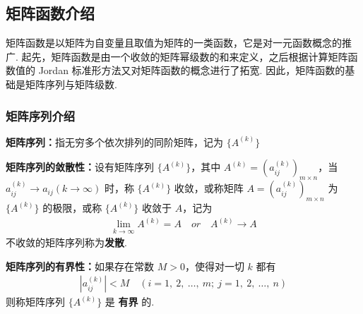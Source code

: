     \subsection{矩阵函数介绍}
        \par 矩阵函数是以矩阵为自变量且取值为矩阵的一类函数，它是对一元函数概念的推广. 起先，矩阵函数是由一个收敛的矩阵幂级数的和来定义，之后根据计算矩阵函数值的 Jordan 标准形方法又对矩阵函数的概念进行了拓宽. 因此，矩阵函数的基础是矩阵序列与矩阵级数.
        \subsubsection{矩阵序列介绍}
            \par \textbf{矩阵序列：}指无穷多个依次排列的同阶矩阵，记为 $\{A^{(k)}\}$
            \par \textbf{矩阵序列的敛散性：}设有矩阵序列 $\{A^{(k)}\}$，其中 $A^{(k)} = (a_{ij}^{(k)})_{m \times n}$，当 $a_{ij}^{(k)} \rightarrow a_{ij}(k \rightarrow \infty)$ 时，称 $\{A^{(k)}\}$ 收敛，或称矩阵 $A = (a_{ij}^{(k)})_{m \times n}$ 为 $\{A^{(k)}\}$ 的极限，或称 $\{A^{(k)}\}$ 收敛于 $A$，记为 
            \begin{align*}
                \lim_{k \rightarrow \infty}A^{(k)} = A \quad or \quad A^{(k)} \rightarrow A 
            \end{align*}
            不收敛的矩阵序列称为\textbf{发散}.
            \par \textbf{矩阵序列的有界性：}如果存在常数 $M > 0$，使得对一切 $k$ 都有 
            \begin{align*}
                |a_{ij}^{(k)}| < M \quad (i = 1, \ 2, \ \dots, \ m; \ j = 1, \ 2, \ \dots, \ n)
            \end{align*}
            则称矩阵序列 $\{A^{(k)}\}$ 是 \textbf{有界} 的.
            
